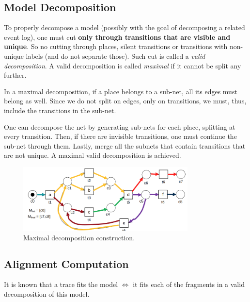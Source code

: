 \documentclass[a4paper]{report}
\begin{document}
\subsection*{Model Decomposition}

To properly decompose a model (possibly with the goal of decomposing a related event log), one must cut \textbf{only through transitions that are visible and unique}. So no cutting through places, silent transitions or transitions with non-unique labels (and do not separate those). Such cut is called a \emph{valid decomposition}. A valid decomposition is called \emph{maximal} if it cannot be split any further.

\begin{note}
    In a maximal decomposition, if a place belongs to a sub-net, all its edges must belong as well. Since we do not split on edges, only on transitions, we must, thus, include the transitions in the sub-net.
\end{note}

\begin{note}
    One can decompose the net by generating sub-nets for each place, splitting at every transition. Then, if there are invisible transitions, one must continue the sub-net through them. Lastly, merge all the subnets that contain transitions that are not unique. A maximal valid decomposition is achieved.
\end{note}

\begin{figure}[h]
    \centering
    \includegraphics[width=0.8\textwidth]{maximal_decomposition.png}
    \caption{Maximal decomposition construction.}
    \label{fig:maximal_decomposition-png}
\end{figure}

\subsection*{Alignment Computation}

It is known that a trace fits the model $\iff$ it fits each of the fragments in a valid decomposition of this model.
\end{document}
